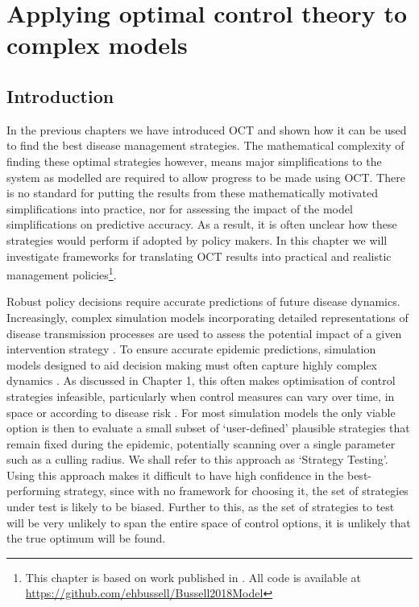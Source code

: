 %
\chapter{Applying optimal control theory to complex models\label{ch:complex_models}}


\section{Introduction\label{sec:ch4:Intro}}

In the previous chapters we have introduced OCT and shown how it can be used to find the best disease management strategies. The mathematical complexity of finding these optimal strategies however, means major simplifications to the system as modelled are required to allow progress to be made using OCT\@. There is no standard for putting the results from these mathematically motivated simplifications into practice, nor for assessing the impact of the model simplifications on predictive accuracy. As a result, it is often unclear how these strategies would perform if adopted by policy makers. In this chapter we will investigate frameworks for translating OCT results into practical and realistic management policies\footnote{This chapter is based on work published in \citet{bussell_applying_2019}. All code is available at \url{https://github.com/ehbussell/Bussell2018Model}}.

Robust policy decisions require accurate predictions of future disease dynamics. Increasingly, complex simulation models incorporating detailed representations of disease transmission processes are used to assess the potential impact of a given intervention strategy \citep{lofgren_opinion_2014}. To ensure accurate epidemic predictions, simulation models designed to aid decision making must often capture highly complex dynamics \citep[Chapter 1,][]{savary_simulation_2014}. As discussed in Chapter 1, this often makes optimisation of control strategies infeasible, particularly when control measures can vary over time, in space or according to disease risk \citep{bellman_dynamic_1957}. For most simulation models the only viable option is then to evaluate a small subset of `user-defined' plausible strategies that remain fixed during the epidemic, potentially scanning over a single parameter such as a culling radius. We shall refer to this approach as `Strategy Testing'. Using this approach makes it difficult to have high confidence in the best-performing strategy, since with no framework for choosing it, the set of strategies under test is likely to be biased. Further to this, as the set of strategies to test will be very unlikely to span the entire space of control options, it is unlikely that the true optimum will be found.

